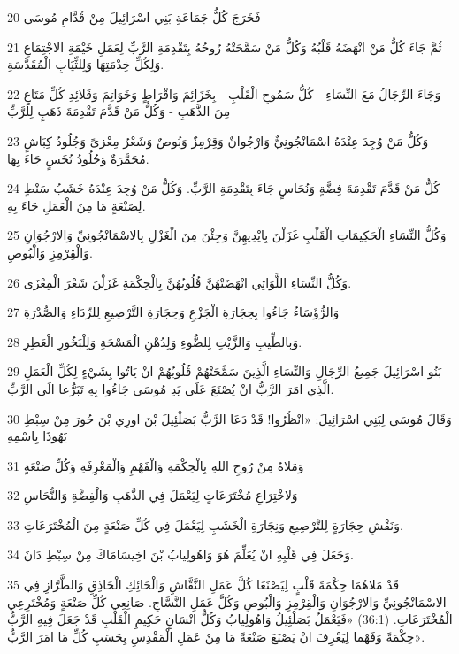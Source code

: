 \par 20 فَخَرَجَ كُلُّ جَمَاعَةِ بَنِي اسْرَائِيلَ مِنْ قُدَّامِ مُوسَى
\par 21 ثُمَّ جَاءَ كُلُّ مَنْ انْهَضَهُ قَلْبُهُ وَكُلُّ مَنْ سَمَّحَتْهُ رُوحُهُ بِتَقْدِمَةِ الرَّبِّ لِعَمَلِ خَيْمَةِ الاجْتِمَاعِ وَلِكُلِّ خِدْمَتِهَا وَلِلثِّيَابِ الْمُقَدَّسَةِ.
\par 22 وَجَاءَ الرِّجَالُ مَعَ النِّسَاءِ - كُلُّ سَمُوحِ الْقَلْبِ - بِخَزَائِمَ وَاقْرَاطٍ وَخَوَاتِمَ وَقَلائِدِ كُلِّ مَتَاعٍ مِنَ الذَّهَبِ - وَكُلُّ مَنْ قَدَّمَ تَقْدِمَةَ ذَهَبٍ لِلرَّبِّ
\par 23 وَكُلُّ مَنْ وُجِدَ عِنْدَهُ اسْمَانْجُونِيٌّ وَارْجُوانٌ وَقِرْمِزٌ وَبُوصٌ وَشَعْرُ مِعْزىً وَجُلُودُ كِبَاشٍ مُحَمَّرَةٌ وَجُلُودُ تُخَسٍ جَاءَ بِهَا.
\par 24 كُلُّ مَنْ قَدَّمَ تَقْدِمَةَ فِضَّةٍ وَنُحَاسٍ جَاءَ بِتَقْدِمَةِ الرَّبِّ. وَكُلُّ مَنْ وُجِدَ عِنْدَهُ خَشَبُ سَنْطٍ لِصَنْعَةٍ مَا مِنَ الْعَمَلِ جَاءَ بِهِ.
\par 25 وَكُلُّ النِّسَاءِ الْحَكِيمَاتِ الْقَلْبِ غَزَلْنَ بِايْدِيهِنَّ وَجِئْنَ مِنَ الْغَزْلِ بِالاسْمَانْجُونِيِّ وَالارْجُوَانِ وَالْقِرْمِزِ وَالْبُوصِ.
\par 26 وَكُلُّ النِّسَاءِ اللَّوَاتِي انْهَضَتْهُنَّ قُلُوبُهُنَّ بِالْحِكْمَةِ غَزَلْنَ شَعْرَ الْمِعْزَى.
\par 27 وَالرُّؤَسَاءُ جَاءُوا بِحِجَارَةِ الْجَزْعِ وَحِجَارَةِ التَّرْصِيعِ لِلرِّدَاءِ وَالصُّدْرَةِ
\par 28 وَبِالطِّيبِ وَالزَّيْتِ لِلضُّوءِ وَلِدُهْنِ الْمَسْحَةِ وَلِلْبَخُورِ الْعَطِرِ.
\par 29 بَنُو اسْرَائِيلَ جَمِيعُ الرِّجَالِ وَالنِّسَاءِ الَّذِينَ سَمَّحَتْهُمْ قُلُوبُهُمْ انْ يَاتُوا بِشَيْءٍ لِكُلِّ الْعَمَلِ الَّذِي امَرَ الرَّبُّ انْ يُصْنَعَ عَلَى يَدِ مُوسَى جَاءُوا بِهِ تَبَرُّعا الَى الرَّبِّ.
\par 30 وَقَالَ مُوسَى لِبَنِي اسْرَائِيلَ: «انْظُرُوا! قَدْ دَعَا الرَّبُّ بَصَلْئِيلَ بْنَ اورِي بْنَ حُورَ مِنْ سِبْطِ يَهُوذَا بِاسْمِهِ
\par 31 وَمَلاهُ مِنْ رُوحِ اللهِ بِالْحِكْمَةِ وَالْفَهْمِ وَالْمَعْرِفَةِ وَكُلِّ صَنْعَةٍ
\par 32 وَلاخْتِرَاعِ مُخْتَرَعَاتٍ لِيَعْمَلَ فِي الذَّهَبِ وَالْفِضَّةِ وَالنُّحَاسِ
\par 33 وَنَقْشِ حِجَارَةٍ لِلتَّرْصِيعِ وَنِجَارَةِ الْخَشَبِ لِيَعْمَلَ فِي كُلِّ صَنْعَةٍ مِنَ الْمُخْتَرَعَاتِ.
\par 34 وَجَعَلَ فِي قَلْبِهِ انْ يُعَلِّمَ هُوَ وَاهُولِيابُ بْنَ اخِيسَامَاكَ مِنْ سِبْطِ دَانَ.
\par 35 قَدْ مَلاهُمَا حِكْمَةَ قَلْبٍ لِيَصْنَعَا كُلَّ عَمَلِ النَّقَّاشِ وَالْحَائِكِ الْحَاذِقِ وَالطَّرَّازِ فِي الاسْمَانْجُونِيِّ وَالارْجُوَانِ وَالْقِرْمِزِ وَالْبُوصِ وَكُلَّ عَمَلِ النَّسَّاجِ. صَانِعِي كُلِّ صَنْعَةٍ وَمُخْتَرِعِي الْمُخْتَرَعَاتِ. (36:1) «فَيَعْمَلُ بَصَلْئِيلُ وَاهُولِيابُ وَكُلُّ انْسَانٍ حَكِيمِ الْقَلْبِ قَدْ جَعَلَ فِيهِ الرَّبُّ حِكْمَةً وَفَهْما لِيَعْرِفَ انْ يَصْنَعَ صَنْعَةً مَا مِنْ عَمَلِ الْمَقْدِسِ بِحَسَبِ كُلِّ مَا امَرَ الرَّبُّ».

